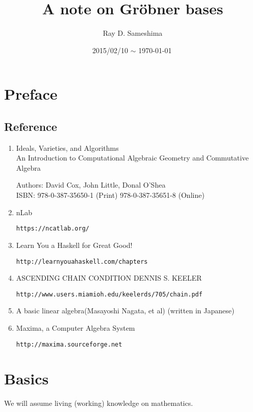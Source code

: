 \documentclass[11pt]{book}
\begin{document}
\newcommand{\Slash}[1]{{\ooalign{\hfil/\crcr$#1$}}}

\title{ A note on Gr\"obner bases}
\author{Ray D. Sameshima}
\date{2015/02/10 $\sim$ \today \, \currenttime}
\maketitle

\tableofcontents

\setcounter{chapter}{-2}
\chapter{Preface}

\section{Reference}
\begin{enumerate}
\item Ideals, Varieties, and Algorithms\\
An Introduction to Computational Algebraic Geometry and Commutative Algebra

Authors: David Cox, John Little, Donal O'Shea\\
ISBN: 978-0-387-35650-1 (Print) 978-0-387-35651-8 (Online)

\item nLab

\verb|https://ncatlab.org/|

\item Learn You a Haskell for Great Good!

\verb|http://learnyouahaskell.com/chapters|

\item ASCENDING CHAIN CONDITION
DENNIS S. KEELER

\verb|http://www.users.miamioh.edu/keelerds/705/chain.pdf|

\item A basic linear algebra(Masayoshi Nagata, et al) (written in Japanese)

\item Maxima, a Computer Algebra System

\verb|http://maxima.sourceforge.net|

\end{enumerate}

\chapter{Basics}
We will assume living (working) knowledge on mathematics.
\end{document}
